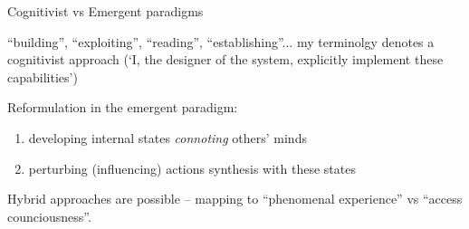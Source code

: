 \documentclass[compress]{beamer}
\begin{document}
{
\begin{frame}{Cognitivist vs Emergent paradigms}

    ``building'', ``exploiting'', ``reading'', ``establishing''... my terminolgy
    denotes a cognitivist approach (`I, the designer of the system, explicitly implement
    these capabilities')

    \pause
    
    Reformulation in the emergent paradigm:

    \begin{enumerate}
        \item developing internal states \emph{connoting} others' minds
        \item perturbing (influencing) actions synthesis with these states
    \end{enumerate}

    \pause

    Hybrid approaches are possible -- mapping to ``phenomenal experience'' vs
    ``access counciousness''.
\end{frame}
}
\end{document}
